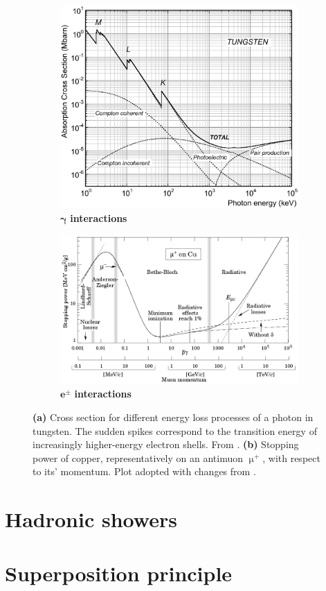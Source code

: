 \begin{figure}
	\begin{subfigure}[b]{0.425\textwidth}
		\centering
		\includegraphics[width=\textwidth]{./plots/photon_cross_section.png}
		\caption{$\mathbf{\gamma}$\textbf{ interactions}}
		\label{fig:gamma-interactions}
	\end{subfigure}
	\hfill
	\begin{subfigure}[b]{0.575\textwidth}
		\centering
		\includegraphics[width=\textwidth]{./plots/electron_ionisation_loss.png}
		\caption{$\mathbf{e^\pm}$\textbf{ interactions}}
		\label{fig:electron-interactions}
	\end{subfigure}
	\caption{\textbf{(a)} Cross section for different energy loss processes of a photon in tungsten. The sudden spikes correspond to the transition energy of 
	increasingly higher-energy electron shells. From \cite{chen2007interactions}. \textbf{(b)} Stopping power of copper, representatively on an antimuon $\upmu^+$, 
	with respect to its' momentum. Plot adopted with changes from \cite{meroli2017straggling}.}
	\label{fig:ionization-losses}
\end{figure}

\section{Hadronic showers}
\label{sec:heitler-matthews-model}

\section{Superposition principle}
\label{sec:superposition-principle}